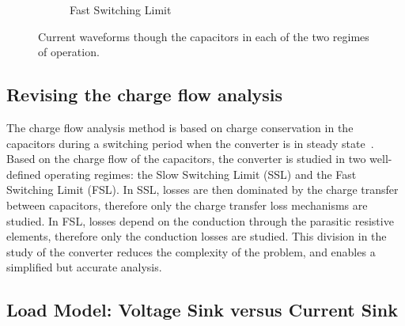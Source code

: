 \begin{figure}[!h]
\begin{subfigure}[t]{.45\textwidth}
    \caption{Fast Switching Limit}
    \label{fig:ic_fsl}
\end{subfigure}
\caption{Current waveforms though the capacitors in each of the two regimes of operation. }
\label{fig:capacitor_current}
\end{figure}


\subsection{Revising the charge flow analysis}



The charge flow analysis method is based on charge conservation in the capacitors during a switching period when the converter is in steady state~\cite{95Makowski}. Based on the charge flow of the capacitors, the converter is studied in two well-defined operating regimes: the Slow Switching Limit (SSL) and the Fast Switching Limit (FSL). In SSL, losses are then dominated by the charge transfer between capacitors, therefore only the charge transfer loss mechanisms are studied.  In FSL, losses depend on the conduction through the parasitic resistive elements, therefore only the conduction losses are studied. This division in the study of the converter reduces the complexity of the problem, and enables a simplified but accurate analysis.

\subsection{Load Model: Voltage Sink versus Current Sink}

